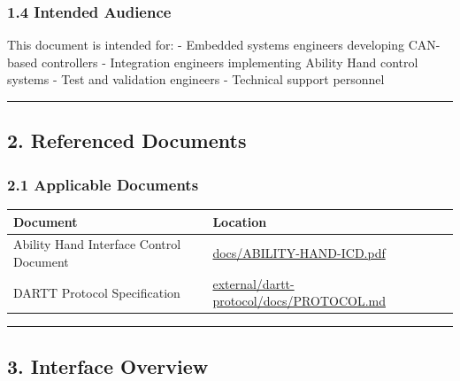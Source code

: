 \documentclass[
  11pt,
]{article}
\newcounter{none} %
\begin{document}
\subsubsection{1.4 Intended Audience}\label{intended-audience}

This document is intended for: - Embedded systems engineers developing
CAN-based controllers - Integration engineers implementing Ability Hand
control systems - Test and validation engineers - Technical support
personnel

\begin{center}\rule{0.5\linewidth}{0.5pt}\end{center}

\subsection{2. Referenced Documents}\label{referenced-documents}

\subsubsection{2.1 Applicable Documents}\label{applicable-documents}

{\def\LTcaptype{none} %
\begin{longtable}[]{@{}
  >{\raggedright\arraybackslash}p{}
  >{\raggedright\arraybackslash}p{}@{}}
\toprule\noalign{}
\begin{minipage}[b]{\linewidth}\raggedright
Document
\end{minipage} & \begin{minipage}[b]{\linewidth}\raggedright
Location
\end{minipage} \\
\midrule\noalign{}
\endhead
\bottomrule\noalign{}
\endlastfoot
Ability Hand Interface Control Document &
\href{./ABILITY-HAND-ICD.pdf}{docs/ABILITY-HAND-ICD.pdf} \\
DARTT Protocol Specification &
\href{../external/dartt-protocol/docs/PROTOCOL.md}{external/dartt-protocol/docs/PROTOCOL.md} \\
\end{longtable}
}

\begin{center}\rule{0.5\linewidth}{0.5pt}\end{center}

\subsection{3. Interface Overview}\label{interface-overview}
\end{document}
